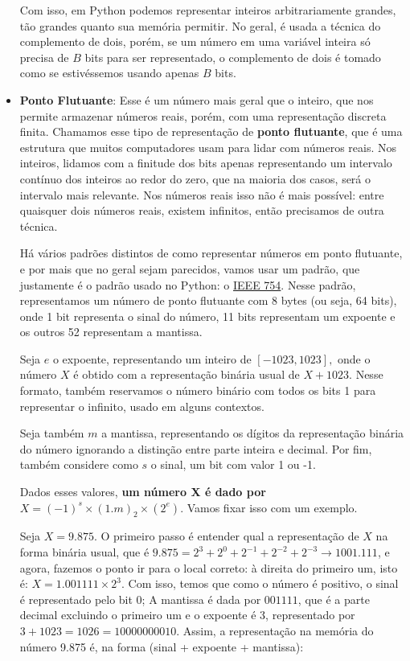 \documentclass[11pt, a4paper]{article}
\begin{document}
\begin{itemize}
    Com isso, em Python podemos representar inteiros arbitrariamente grandes, tão grandes quanto sua memória permitir. No geral, é usada a técnica do complemento de dois, porém, se um número em uma variável inteira só precisa de \(B\) bits para ser representado, o complemento de dois é tomado como se estivéssemos usando apenas \(B\) bits.

    \item \textbf{Ponto Flutuante}: Esse é um número mais geral que o inteiro, que nos permite armazenar números reais, porém, com uma representação discreta finita. Chamamos esse tipo de representação de \textbf{ponto flutuante}, que é uma estrutura que muitos computadores usam para lidar com números reais. Nos inteiros, lidamos com a finitude dos bits apenas representando um intervalo contínuo dos inteiros ao redor do zero, que na maioria dos casos, será o intervalo mais relevante. Nos números reais isso não é mais possível: entre quaisquer dois números reais, existem infinitos, então precisamos de outra técnica.

    Há vários padrões distintos de como representar números em ponto flutuante, e por mais que no geral sejam parecidos, vamos usar um padrão, que justamente é o padrão usado no Python: o \href{https://en.wikipedia.org/wiki/IEEE_754}{IEEE 754}. Nesse padrão, representamos um número de ponto flutuante com 8 bytes (ou seja, 64 bits), onde 1 bit representa o sinal do número, 11 bits representam um expoente e os outros 52 representam a mantissa.

    Seja \(e\) o expoente, representando um inteiro de \([-1023,1023],\) onde o número \(X\) é obtido com a representação binária usual de \(X+1023\). Nesse formato, também reservamos o número binário com todos os bits 1 para representar o infinito, usado em alguns contextos.

    Seja também \(m\) a mantissa, representando os dígitos da representação binária do número ignorando a distinção entre parte inteira e decimal. Por fim, também considere como \(s\) o sinal, um bit com valor 1 ou -1.

    Dados esses valores, \textbf{um número X é dado por } \(X=(-1)^s \times (1.m)_{2} \times (2^e)\). Vamos fixar isso com um exemplo.

    Seja \(X=9.875\). O primeiro passo é entender qual a representação de \(X\) na forma binária usual, que é \(9.875 = 2^3+2^0+2^{-1}+2^{-2}+2^{-3} \rightarrow 1001.111\), e agora, fazemos o ponto ir para o local correto: à direita do primeiro um, isto é: \(X=1.001111 \times 2^3\). Com isso, temos que como o número é positivo, o sinal é representado pelo bit 0; A mantissa é dada por \(001111\), que é a parte decimal excluindo o primeiro um e o expoente é 3, representado por \(3+1023=1026=10000000010\). Assim, a representação na memória do número 9.875 é, na forma (sinal + expoente + mantissa):


\end{itemize}
\end{document}
